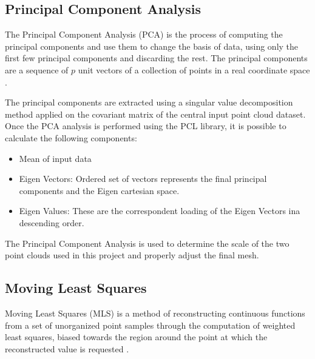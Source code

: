 \documentclass[12pt]{report}
\begin{document}
\subsection{Principal Component Analysis}
\label{section:Principal Component Analysis}
The Principal Component Analysis (PCA) is the process of computing the principal components and use them to change the basis of data, using only the first few principal components
and discarding the rest. The principal components are a sequence of $p$ unit vectors of a collection of points in a real coordinate space .

The principal components are extracted using a singular value decomposition method applied on the covariant matrix of the central input point cloud dataset.
Once the PCA analysis is performed using the PCL library, it is possible to calculate the following components:
\begin{itemize}
  \item Mean of input data
  \item Eigen Vectors: Ordered set of vectors represents the final principal components and the Eigen cartesian space.
  \item Eigen Values: These are the correspondent loading of the Eigen Vectors ina descending order.
\end{itemize}

The Principal Component Analysis is used to determine the scale of the two point clouds used in this project and properly adjust the final mesh.





\subsection{Moving Least Squares}
\label{section:Moving Least Squares}

Moving Least Squares (MLS) is a method of reconstructing continuous functions from a set of unorganized point samples through the computation of weighted least squares, 
biased towards the region around the point at which the reconstructed value is requested .
\end{document}
